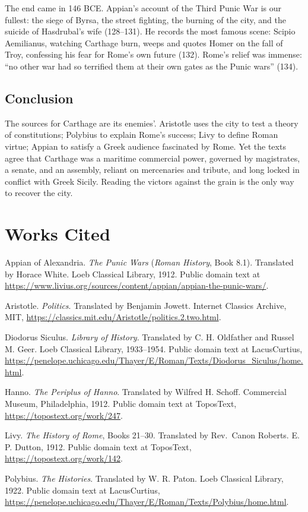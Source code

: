 \documentclass[12pt]{article}
\begin{document}
The end came in 146 BCE. Appian's account of the Third Punic War is our
fullest: the siege of Byrsa, the street fighting, the burning of the
city, and the suicide of Hasdrubal's wife (128--131). He records the
most famous scene: Scipio Aemilianus, watching Carthage burn, weeps and
quotes Homer on the fall of Troy, confessing his fear for Rome's own
future (132). Rome's relief was immense: ``no other war had so terrified
them at their own gates as the Punic wars'' (134).

\subsection{Conclusion}

The sources for Carthage are its enemies'. Aristotle uses the city to
test a theory of constitutions; Polybius to explain Rome's success; Livy
to define Roman virtue; Appian to satisfy a Greek audience fascinated by
Rome. Yet the texts agree that Carthage was a maritime commercial power,
governed by magistrates, a senate, and an assembly, reliant on
mercenaries and tribute, and long locked in conflict with Greek Sicily.
Reading the victors against the grain is the only way to recover the
city.

\newpage
\section*{Works Cited}

\noindent\hangindent=0.5in Appian of Alexandria. \emph{The Punic Wars} (\emph{Roman History}, Book
8.1). Translated by Horace White. Loeb Classical Library, 1912. Public
domain text at
\url{https://www.livius.org/sources/content/appian/appian-the-punic-wars/}.

\noindent\hangindent=0.5in Aristotle. \emph{Politics}. Translated by Benjamin Jowett. Internet
Classics Archive, MIT,
\url{https://classics.mit.edu/Aristotle/politics.2.two.html}.

\noindent\hangindent=0.5in Diodorus Siculus. \emph{Library of History}. Translated by C. H.
Oldfather and Russel M. Geer. Loeb Classical Library, 1933--1954. Public
domain text at LacusCurtius,
\url{https://penelope.uchicago.edu/Thayer/E/Roman/Texts/Diodorus_Siculus/home.html}.

\noindent\hangindent=0.5in Hanno. \emph{The Periplus of Hanno}. Translated by Wilfred H. Schoff.
Commercial Museum, Philadelphia, 1912. Public domain text at ToposText,
\url{https://topostext.org/work/247}.

\noindent\hangindent=0.5in Livy. \emph{The History of Rome}, Books 21--30. Translated by Rev.~Canon
Roberts. E. P. Dutton, 1912. Public domain text at ToposText,
\url{https://topostext.org/work/142}.

\noindent\hangindent=0.5in Polybius. \emph{The Histories}. Translated by W. R. Paton. Loeb
Classical Library, 1922. Public domain text at LacusCurtius,
\url{https://penelope.uchicago.edu/Thayer/E/Roman/Texts/Polybius/home.html}.
\end{document}
